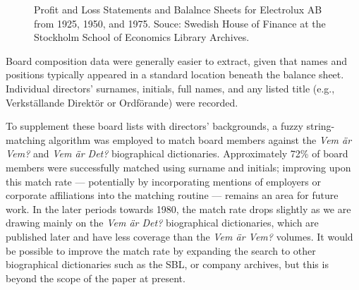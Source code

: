 \documentclass[
]{article}
\begin{document}
\begin{figure}
\begin{minipage}{0.50\linewidth}


\end{minipage}%

\caption{\label{fig-reportsone}Profit and Loss Statements and Balalnce
Sheets for Electrolux AB from 1925, 1950, and 1975. Souce: Swedish House
of Finance at the Stockholm School of Economics Library Archives.}

\end{figure}%

\newpage{}

Board composition data were generally easier to extract, given that
names and positions typically appeared in a standard location beneath
the balance sheet. Individual directors' surnames, initials, full names,
and any listed title (e.g., Verkställande Direktör or Ordförande) were
recorded.

To supplement these board lists with directors' backgrounds, a fuzzy
string-matching algorithm was employed to match board members against
the \emph{Vem är Vem?} and \emph{Vem är Det?} biographical dictionaries.
Approximately 72\% of board members were successfully matched using
surname and initials; improving upon this match rate --- potentially by
incorporating mentions of employers or corporate affiliations into the
matching routine --- remains an area for future work. In the later
periods towards 1980, the match rate drops slightly as we are drawing
mainly on the \emph{Vem är Det?} biographical dictionaries, which are
published later and have less coverage than the \emph{Vem är Vem?}
volumes. It would be possible to improve the match rate by expanding the
search to other biographical dictionaries such as the SBL, or company
archives, but this is beyond the scope of the paper at present.
\end{document}
